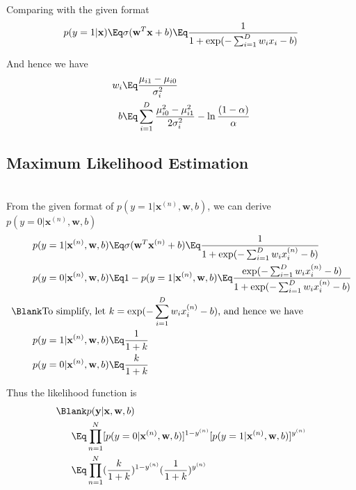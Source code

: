 \documentclass{article}
\begin{document}
Comparing with the given format
\begin{align*}
p(y=1 | \mathbf{x}) \Eq \sigma(\mathbf{w}^{T}\mathbf{x}+b) \Eq \frac{1}{1 + \exp(-\sum_{i=1}^{D} w_{i}x_{i}-b)}
\end{align*}

And hence we have
\begin{align*}
w_i \Eq & \dfrac{\mu_{i1} - \mu_{i0}}{\sigma_i^2} \\
b \Eq & \sum_{i=1}^{D}  \dfrac{\mu_{i0}^2 - \mu_{i1}^2}{2\sigma_i^2} - \ln\dfrac{(1-\alpha)}{\alpha}\\
\end{align*}

\subsection{Maximum Likelihood Estimation}

\ \\

From the given format of $p(y=1| \mathbf{x}^{(n)}, \mathbf{w}, b)$, we can derive $p(y=0| \mathbf{x}^{(n)}, \mathbf{w}, b)$
\begin{align*}
p(y=1| \mathbf{x}^{(n)}, \mathbf{w}, b) & \Eq \sigma(\mathbf{w}^{T}\mathbf{x}^{(n)} + b) \Eq \frac{1}{1 + \exp(-\sum_{i=1}^{D} w_{i}x_{i}^{(n)} - b)}\\
p(y=0| \mathbf{x}^{(n)}, \mathbf{w}, b) & \Eq 1 - p(y=1| \mathbf{x}^{(n)}, \mathbf{w}, b) \Eq \frac{\exp(-\sum_{i=1}^{D} w_{i}x_{i}^{(n)} - b)}{1 + \exp(-\sum_{i=1}^{D} w_{i}x_{i}^{(n)} - b)}\\
\Blank \text{To simplify, let } & k = \exp(-\sum_{i=1}^{D} w_{i}x_{i}^{(n)} - b) \text{, and hence we have}\\
p(y=1| \mathbf{x}^{(n)}, \mathbf{w}, b) & \Eq \frac{1}{1 + k}\\
p(y=0| \mathbf{x}^{(n)}, \mathbf{w}, b) & \Eq \frac{k}{1 + k}
\end{align*}

Thus the likelihood function is
\begin{align*}
\Blank & p(\mathbf{y} | \mathbf{x}, \mathbf{w}, b)\\
\Eq & \prod_{n=1}^{N} [p(y=0 | \mathbf{x}^{(n)}, \mathbf{w}, b)]^{1-y^{(n)}} [p(y=1| \mathbf{x}^{(n)}, \mathbf{w}, b)]^{y^{(n)}}\\
\Eq & \prod_{n=1}^{N} (\frac{k}{1 + k})^{1-y^{(n)}} (\frac{1}{1 + k})^{y^{(n)}}
\end{align*}
\end{document}
